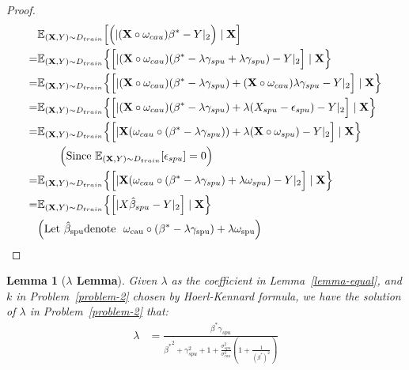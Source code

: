 \documentclass{article}
\theoremstyle{plain}
\newtheorem{lemma}[theorem]{Lemma}
\theoremstyle{definition}
\theoremstyle{remark}
\begin{document}
\begin{proof}
\begin{align*}
&\mathbb{E}_{(\textbf{X},Y)\sim   D_{train}}\Big[\Big(|(\textbf{X}\circ\omega_{cau})\beta^*-Y|_2\Big)\mid \textbf{X}\Big]\\
=&\mathbb{E}_{(\textbf{X},Y)\sim D_{train}}\Big\{\Big[|(\textbf{X}\circ\omega_{cau})(\beta^*-\lambda\gamma_{spu}+\lambda\gamma_{spu})
-Y|_2\Big]\mid \textbf{X}\Big\}\\
=&\mathbb{E}_{(\textbf{X},Y)\sim D_{train}}\Big\{\Big[|(\textbf{X}\circ\omega_{cau})(\beta^*-\lambda\gamma_{spu}) 
+(\textbf{X}\circ\omega_{cau})\lambda \gamma_{spu}-Y|_2\Big]\mid \textbf{X}\Big\}\\
=&\mathbb{E}_{(\textbf{X},Y)\sim D_{train}}\Big\{\Big[|(\textbf{X}\circ \omega_{cau})(\beta^*-\lambda\gamma_{spu})
+\lambda (X_{spu}-\epsilon_{spu})-Y|_2\Big]\mid \textbf{X}\Big\}\\
=&\mathbb{E}_{(\textbf{X},Y)\sim D_{train}}\Big\{\Big[|\textbf{X}(\omega_{cau}\circ(\beta^*-\lambda\gamma_{spu}))
+\lambda (\textbf{X}\circ\omega_{spu})-Y|_2\Big]\mid \textbf{X}\Big\}\\
 &\quad \quad\Big(\textrm{Since\ }\mathbb{E}_{(\textbf{X},Y)\sim D_{train}}[\epsilon_{spu}]=0\Big)\\
=&\mathbb{E}_{(\textbf{X},Y)\sim D_{train}}\Big\{\Big[|\textbf{X}(\omega_{cau}\circ(\beta^*-\lambda\gamma_{spu})+\lambda\omega_{spu})
-Y|_2\Big]\mid \textbf{X}\Big\}\\
=&\mathbb{E}_{(\textbf{X},Y)\sim D_{train}}\Big\{\Big[| X\hat{\beta}_{spu}-Y|_2\Big]\mid \textbf{X}\Big\} 
\quad \quad  \\
&\Big(\rm{Let} \  \hat{\beta}_{spu} \rm{denote} \ \ \omega_{cau}\circ(\beta^*-\lambda\gamma_{spu})+\lambda\omega_{spu}\Big)
\end{align*}
\end{proof}
\begin{lemma}[\textbf{$\lambda$ Lemma}]
Given $\lambda$ as the coefficient in Lemma~\ref{lemma-equal}, and $k$ in Problem~\ref{problem-2} chosen by Hoerl-Kennard formula, we have the solution of $\lambda$ in Problem~\ref{problem-2} that:
\begin{align}
\lambda
&=\frac{ \beta^*\gamma_{spu}}{{\beta^*}^2+ \gamma_{spu}^{2}+1+\frac{\sigma ^{2}_{spu}}{\sigma^2_{cau}}(1+\frac{1}{(\beta^*)^2})}
\end{align}
\end{lemma}
\end{document}

